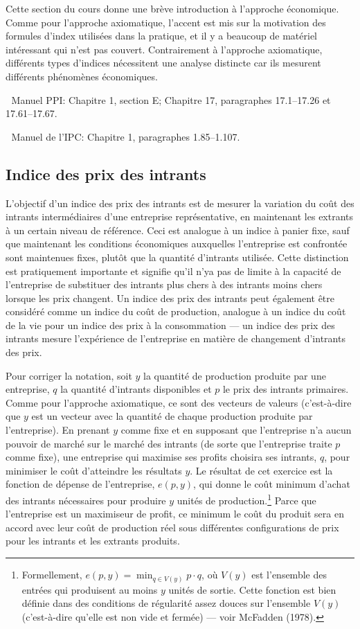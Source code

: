\documentclass[
]{article}
\begin{document}
Cette section du cours donne une brève introduction à l'approche économique. Comme pour l'approche axiomatique, l'accent est mis sur la motivation des formules d'index utilisées dans la pratique, et il y a beaucoup de matériel intéressant qui n'est pas couvert. Contrairement à l'approche axiomatique, différents types d'indices nécessitent une analyse distincte car ils mesurent différents phénomènes économiques.

📖 Manuel PPI: Chapitre 1, section E; Chapitre 17, paragraphes 17.1--17.26 et 17.61--17.67.

📖 Manuel de l'IPC: Chapitre 1, paragraphes 1.85--1.107.

\hypertarget{indice-des-prix-des-intrants}{%
\subsection{Indice des prix des intrants}\label{indice-des-prix-des-intrants}}

L'objectif d'un indice des prix des intrants est de mesurer la variation du coût des intrants intermédiaires d'une entreprise représentative, en maintenant les extrants à un certain niveau de référence. Ceci est analogue à un indice à panier fixe, sauf que maintenant les conditions économiques auxquelles l'entreprise est confrontée sont maintenues fixes, plutôt que la quantité d'intrants utilisée. Cette distinction est pratiquement importante et signifie qu'il n'ya pas de limite à la capacité de l'entreprise de substituer des intrants plus chers à des intrants moins chers lorsque les prix changent. Un indice des prix des intrants peut également être considéré comme un indice du coût de production, analogue à un indice du coût de la vie pour un indice des prix à la consommation --- un indice des prix des intrants mesure l'expérience de l'entreprise en matière de changement d'intrants des prix.

Pour corriger la notation, soit \(y\) la quantité de production produite par une entreprise, \(q\) la quantité d'intrants disponibles et \(p\) le prix des intrants primaires. Comme pour l'approche axiomatique, ce sont des vecteurs de valeurs (c'est-à-dire que \(y\) est un vecteur avec la quantité de chaque production produite par l'entreprise). En prenant \(y\) comme fixe et en supposant que l'entreprise n'a aucun pouvoir de marché sur le marché des intrants (de sorte que l'entreprise traite \(p\) comme fixe), une entreprise qui maximise ses profits choisira ses intrants, \(q\), pour minimiser le coût d'atteindre les résultats \(y\). Le résultat de cet exercice est la fonction de dépense de l'entreprise, \(e(p, y)\), qui donne le coût minimum d'achat des intrants nécessaires pour produire \(y\) unités de production.\footnote{Formellement, \(e(p, y) = \min_{q \in V(y)} p \cdot q\), où \(V(y)\) est l'ensemble des entrées qui produisent au moins \(y\) unités de sortie. Cette fonction est bien définie dans des conditions de régularité assez douces sur l'ensemble \(V(y)\) (c'est-à-dire qu'elle est non vide et fermée) --- voir McFadden (1978).} Parce que l'entreprise est un maximiseur de profit, ce minimum le coût du produit sera en accord avec leur coût de production réel sous différentes configurations de prix pour les intrants et les extrants produits.
\end{document}
